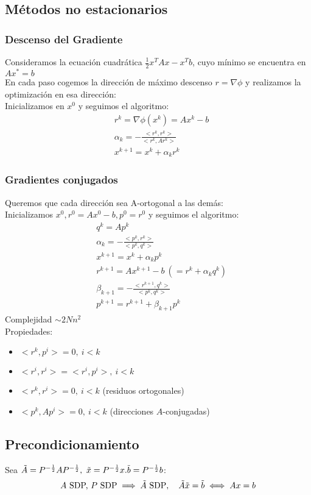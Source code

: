 \documentclass[leqno]{article}
\newcommand{\h}{\hspace{1em}}
\begin{document}
\subsection{Métodos no estacionarios}
\subsubsection{Descenso del Gradiente}
Consideramos la ecuación cuadrática $\frac{1}{2}x^TAx - x^Tb$, cuyo mínimo se encuentra en $Ax^* = b$ \\
En cada paso cogemos la dirección de máximo descenso $r = \nabla \phi$ y realizamos la optimización en esa dirección: \\
Inicializamos en $x^0$ y seguimos el algoritmo:
\begin{align}
    & r^k = \nabla \phi (x^k) = Ax^{k} - b \\
    & \alpha_k = -\frac{<r^k, r^k>}{<r^k, Ar^k>} \\
    & x^{k+1} = x^k + \alpha_kr^k
\end{align}


\subsubsection{Gradientes conjugados}
Queremos que cada dirección sea A-ortogonal a las demás:
\\
Inicializamos $x^0, r^0 = Ax^0-b, p^0 = r^0$ y seguimos el algoritmo:
\setcounter{equation}{0}
\begin{align}
    & q^k = Ap^k \\
    & \alpha_k = -\frac{<p^k, r^k>}{<p^k, q^k>} \\
    & x^{k+1} = x^k + \alpha_kp^k\\
    & r^{k+1} = Ax^{k+1}-b\ (=r^k + \alpha_kq^k)\\
    & \beta_{k+1} = -\frac{<r^{k+1}, q^k>}{<p^k, q^k>}\\
    & p^{k+1} = r^{k+1} + \beta_{k+1}p^k
\end{align}
Complejidad $\sim 2Nn^2$ \\
Propiedades:
\begin{itemize}
    \item $<r^k, p^i>=0, \ i<k$
    \item $<r^i, r^i>=<r^i, p^i>, \ i<k$
    \item $<r^k, r^i>=0, \ i<k$ (residuos ortogonales)
    \item $<p^k, Ap^i>=0, \ i<k$ (direcciones $A$-conjugadas)
\end{itemize}

\subsection{Precondicionamiento}
Sea $\Tilde{A} = P^{-\frac{1}{2}}AP^{-\frac{1}{2}}, \ \Tilde{x} = P^{-\frac{1}{2}}x. \Tilde{b} = P^{-\frac{1}{2}}b$:
$$
A \text{ SDP, } P \text{ SDP} \implies \tilde{A} \text{ SDP}, \h  \Tilde{A}\Tilde{x} = \Tilde{b} \iff Ax =b
$$
\end{document}
